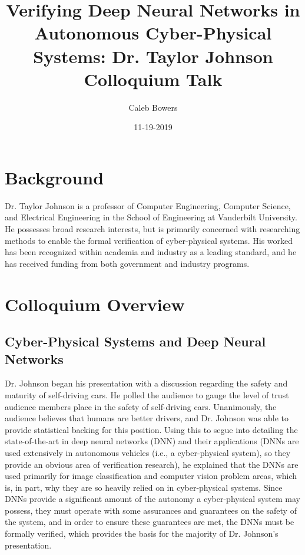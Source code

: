 \documentclass[10pt, journal]{IEEEtran}
\title{Verifying Deep Neural Networks in Autonomous Cyber-Physical Systems: Dr. Taylor Johnson Colloquium Talk}
\author{Caleb Bowers}
\date{11-19-2019}
\begin{document}
\maketitle

\section{Background}
Dr. Taylor Johnson is a professor of Computer Engineering, Computer Science, and Electrical Engineering in the School of Engineering at Vanderbilt University. He possesses broad research interests, but is primarily concerned with researching methods to enable the formal verification of cyber-physical systems. His worked has been recognized within academia and industry as a leading standard, and he has received funding from both government and industry programs.

\section{Colloquium Overview}
\subsection{Cyber-Physical Systems and Deep Neural Networks}
Dr. Johnson began his presentation with a discussion regarding the safety and maturity of self-driving cars. He polled the audience to gauge the level of trust audience members place in the safety of self-driving cars. Unanimously, the audience believes that humans are better drivers, and Dr. Johnson was able to provide statistical backing for this position. Using this to segue into detailing the state-of-the-art in deep neural networks (DNN) and their applications (DNNs are used extensively in autonomous vehicles (i.e., a cyber-physical system), so they provide an obvious area of verification research), he explained that the DNNs are used primarily for image classification and computer vision problem areas, which is, in part, why they are so heavily relied on in cyber-physical systems. Since DNNs provide a significant amount of the autonomy a cyber-physical system may possess, they must operate with some assurances and guarantees on the safety of the system, and in order to ensure these guarantees are met, the DNNs must be formally verified, which provides the basis for the majority of Dr. Johnson's presentation.
\end{document}
